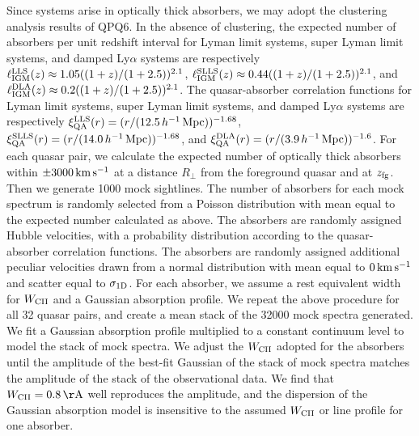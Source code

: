 \documentclass[iop]{emulateapj}
\begin{document}
Since  systems arise in optically thick absorbers, we may adopt the clustering analysis 
results of QPQ6. In the absence of clustering, the expected number of absorbers per unit redshift 
interval for Lyman limit systems, super Lyman limit systems, and damped Ly$\alpha$ systems are 
respectively $\ell_{\rm IGM}^{\rm LLS}(z)\approx1.05((1+z)/(1+2.5))^{2.1}$, 
$\ell_{\rm IGM}^{\rm SLLS}(z)\approx0.44((1+z)/(1+2.5))^{2.1}$, and 
$\ell_{\rm IGM}^{\rm DLA}(z)\approx0.2((1+z)/(1+2.5))^{2.1}$. The quasar-absorber correlation 
functions for Lyman limit systems, super Lyman limit systems, and damped Ly$\alpha$ systems are 
respectively $\xi_{\rm QA}^{\rm LLS}(r)=(r/(12.5\,h^{-1}\,{\rm Mpc}))^{-1.68}$, 
$\xi_{\rm QA}^{\rm SLLS}(r)=(r/(14.0\,h^{-1}\,{\rm Mpc}))^{-1.68}$, and 
$\xi_{\rm QA}^{\rm DLA}(r)=(r/(3.9\,h^{-1}\,{\rm Mpc}))^{-1.6}$. 
For each quasar pair, we calculate the expected number of optically thick absorbers within 
$\pm3000\,{\rm km\,s^{-1}}$ at a distance $R_\perp$ from the foreground quasar and at 
$z_{\rm fg}$. Then we generate 1000 mock sightlines. The number of absorbers for each mock 
spectrum is randomly selected from a Poisson distribution with mean equal to the expected number 
calculated as above. The absorbers are randomly assigned Hubble velocities, with a probability 
distribution according to the quasar-absorber correlation functions. The absorbers are randomly 
assigned additional peculiar velocities drawn from a normal distribution with mean equal to 
$0\,{\rm km\,s^{-1}}$ and scatter equal to $\sigma_{\rm 1D}$. For each absorber, we assume a rest 
equivalent width for  $W_{\rm CII}$ and a Gaussian absorption profile. We repeat the 
above procedure for all 32 quasar pairs, and create a mean stack of the 32000 mock spectra 
generated. We fit a Gaussian absorption profile multiplied to a constant continuum level to model 
the stack of mock spectra. We adjust the $W_{\rm CII}$ adopted for the absorbers until the 
amplitude of the best-fit Gaussian of the stack of mock spectra matches the 
amplitude of the stack of the observational data. We find that $W_{\rm CII}=0.8\,{\rm \AA}$ well 
reproduces the amplitude, and the dispersion of the Gaussian absorption model is 
insensitive to the assumed $W_{\rm CII}$ or line profile for one absorber. 
\end{document}
